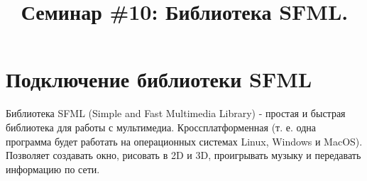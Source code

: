 \documentclass{article}
\begin{document}
\title{Семинар \#10: Библиотека SFML.\vspace{-5ex}}\date{}\maketitle


\section*{Подключение библиотеки SFML}
Библиотека SFML (Simple and Fast Multimedia Library) - простая и быстрая библиотека для работы с мультимедиа. Кроссплатформенная (т. е. одна программа будет работать на операционных системах Linux, Windows и MacOS). Позволяет создавать окно, рисовать в 2D и 3D, проигрывать музыку и передавать информацию по сети. 
\end{document}
